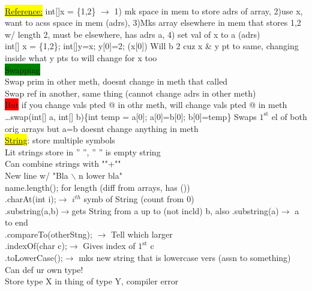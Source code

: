 \\ \colorbox{Yellow}{\underline{Reference:}} int[]x = \{1,2\} $\rightarrow$ 1) mk space in mem to store adrs of array, 2)use x, want to acss space in mem (adrs), 3)Mks array elsewhere in mem that stores 1,2 w/ length 2, must be elsewhere, has adrs a, 4) set val of x to a (adrs)
\\ int[] x = \{1,2\}; int[]y=x; y[0]=2; (x[0]) Will b 2 cuz x \& y pt to same, changing inside what y pts to will change for x too
\\ \colorbox{Green}{Swapping}
\\ Swap prim in other meth, doesnt change in meth that called
\\ Swap ref in another, same thing (cannot change adrs in other meth)
\\ \colorbox{Red}{But} if you change vals pted @ in othr meth, will change vals pted @ in meth
\\ \ldots swap(int[] a, int[] b)\{int temp = a[0]; a[0]=b[0]; b[0]=temp\} Swaps $1^{\text{st}}$ el of both orig arrays but a=b doesnt change anything in meth
\\ \colorbox{Yellow}{\underline{String}}: store multiple symbols
\\ Lit strings store in '' '', '' '' is empty string
\\ Can combine strings with ""+""
\\ New line w/ "Bla $\backslash$ n lower bla"
\\ name.length(); for length (diff from arrays, has ())
\\ .charAt(int i);$\rightarrow$ $i^{th}$ symb of String (count from 0)
\\ .substring(a,b)$\rightarrow$gets String from a up to (not incld) b, also .substring(a)$\rightarrow$ a to end
\\ .compareTo(otherStng); $\rightarrow$ Tell which larger
\\ .indexOf(char c);$\rightarrow$ Gives index of $1^{\text{st}}$ c
\\ .toLowerCase();$\rightarrow$ mks new string that is lowercase vers (assn to something)
\\ Can def ur own type!
\\ Store type X in thing of type Y, compiler error